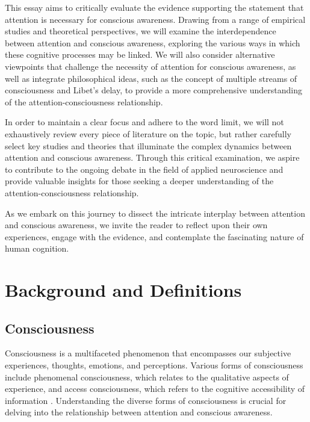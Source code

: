 \documentclass[10pt]{article}
\begin{document}
\begin{sloppypar}
  This essay aims to critically evaluate the evidence supporting the statement that attention is necessary for conscious awareness. Drawing from a range of empirical studies and theoretical perspectives, we will examine the interdependence between attention and conscious awareness, exploring the various ways in which these cognitive processes may be linked. We will also consider alternative viewpoints that challenge the necessity of attention for conscious awareness, as well as integrate philosophical ideas, such as the concept of multiple streams of consciousness and Libet’s delay, to provide a more comprehensive understanding of the attention-consciousness relationship.

  In order to maintain a clear focus and adhere to the word limit, we will not exhaustively review every piece of literature on the topic, but rather carefully select key studies and theories that illuminate the complex dynamics between attention and conscious awareness. Through this critical examination, we aspire to contribute to the ongoing debate in the field of applied neuroscience and provide valuable insights for those seeking a deeper understanding of the attention-consciousness relationship.

  As we embark on this journey to dissect the intricate interplay between attention and conscious awareness, we invite the reader to reflect upon their own experiences, engage with the evidence, and contemplate the fascinating nature of human cognition.

  \section{Background and Definitions}
  \label{sec:background}

  \subsection{Consciousness}
  \label{sec:consciousness}

  Consciousness is a multifaceted phenomenon that encompasses our subjective experiences, thoughts, emotions, and perceptions. Various forms of consciousness include phenomenal consciousness, which relates to the qualitative aspects of experience, and access consciousness, which refers to the cognitive accessibility of information \citep{baars_essential_1997,montemayor_types_2021}. Understanding the diverse forms of consciousness is crucial for delving into the relationship between attention and conscious awareness.


\end{sloppypar}
\end{document}
